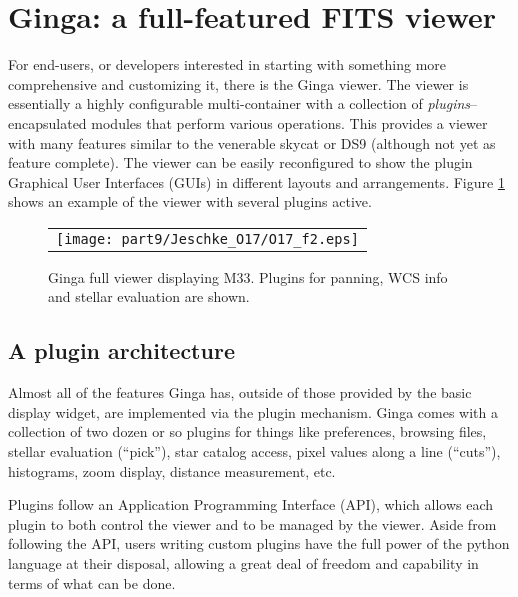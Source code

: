 \section{Ginga: a full-featured FITS viewer}
For end-users, or developers interested in starting with something more
comprehensive and customizing it, there is the Ginga viewer.  The viewer is
essentially a highly configurable multi-container with a collection of
\emph{plugins}--encapsulated modules that perform various operations.
This provides a viewer with many features similar to the venerable
skycat \citep{skycat} or DS9 (although not yet as feature complete).
The viewer can be easily reconfigured to show the plugin Graphical User
Interfaces (GUIs) in different layouts and arrangements.  
Figure \ref{fig:ginga} shows an example of the viewer with several
plugins active. 
\begin{figure}
  \begin{center}
    \begin{tabular}{c}
      \texttt{[image: part9/Jeschke\_O17/O17\_f2.eps]}
    \end{tabular}
  \end{center}
  \caption[example] 
          { \label{fig:ginga} 
            Ginga full viewer displaying M33. Plugins for panning, WCS
            info and stellar evaluation are shown.} 
\end{figure} 

\subsection{A plugin architecture}
Almost all of the features Ginga has, outside of those provided by the
basic display widget, are implemented via the plugin mechanism.
Ginga comes with a collection of two dozen or so plugins for things
like preferences, browsing files, stellar evaluation (``pick''), star
catalog access, pixel values along a line (``cuts''), histograms,
zoom display, distance measurement, etc.

Plugins follow an Application Programming Interface (API), which allows
each plugin to both control the viewer and to be managed by the viewer.
Aside from following the API, users writing custom plugins have the full
power of the python language at their disposal, allowing a great deal of
freedom and capability in terms of what can be done.   

